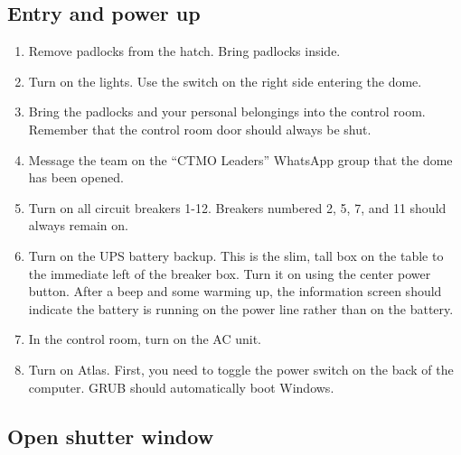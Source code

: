 \documentclass{article}
\begin{document}
	\subsection{Entry and power up}
	\label{sec:entry-and-power-up}
	
	\begin{enumerate}
		
		\item Remove padlocks from the hatch. Bring padlocks inside.
		
		\item Turn on the lights. Use the switch on the right side entering the dome.
		
		\item Bring the padlocks and your personal belongings into the control room. Remember that the control room door should always be shut.
		
		\item Message the team on the ``CTMO Leaders'' WhatsApp group that the dome has been opened.
		
		\item Turn on all circuit breakers 1-12. Breakers numbered 2, 5, 7, and 11 should always remain on.
		
		\item Turn on the UPS battery backup. This is the slim, tall box on the table to the immediate left of the breaker box. Turn it on using the center power button. After a beep and some warming up, the information screen should indicate the battery is running on the power line rather than on the battery.
		
		\item In the control room, turn on the AC unit. 
		
		\item Turn on Atlas. First, you need to toggle the power switch on the back of the computer. GRUB should automatically boot Windows.
		
	\end{enumerate}
	
	\subsection{Open shutter window}
	\label{sec:open-shutter-window}
	
\end{document}
